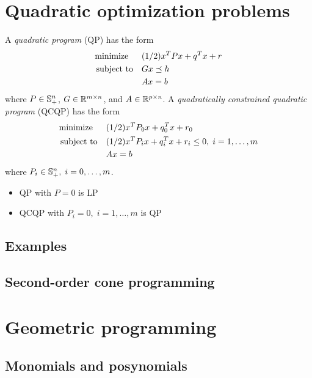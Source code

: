 \section{Quadratic optimization problems}
A \textit{quadratic program} (QP) has the form
\begin{align}
  \text{minimize\;\;}\quad& (1/2)x^TPx+q^Tx+r\nonumber\\
  \text{subject to}  \quad& Gx\preceq h\label{eq:4.34}\\
                          & Ax=b\nonumber
\end{align}
where $P\in\mathbb{S}_{+}^n$, $G\in\mathbb{R}^{m\times n}$, and $A\in\mathbb{R}^{p\times n}$.
A \textit{quadratically constrained quadratic program} (QCQP) has the form
\begin{align}
  \text{minimize\;\;}\quad& (1/2)x^TP_0x+q_0^Tx+r_0\nonumber\\
  \text{subject to}  \quad& (1/2)x^TP_ix+q_i^Tx+r_i\le 0,\;i=1,\dots,m\label{eq:4.35}\\
                          & Ax=b\nonumber
\end{align}
where $P_i\in\mathbb{S}_{+}^n,\;i=0,\dots,m$.
\begin{itemize}
  \item QP with $P=0$ is LP
  \item QCQP with $P_i=0,\;i=1,\dots,m$ is QP
\end{itemize}


\subsection{Examples}

\subsection{Second-order cone programming}
\begin{example}
\end{example}

\section{Geometric programming}

\subsection{Monomials and posynomials}

